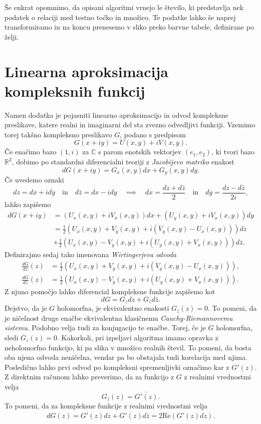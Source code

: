 \documentclass[12pt,a4paper]{amsart}
\theoremstyle{definition} %
\theoremstyle{plain} %
\newcommand{\R}{\mathbb R}
\newcommand{\CC}{\mathbb C}
\newcommand{\Real}{\mathrm{Re}}
\begin{document}
Še enkrat opomnimo, da opisani algoritmi vrnejo le število, ki predstavlja nek podatek o relaciji med testno točko in množico.
Te podatke lahko še naprej transformiramo in na koncu prenesemo v sliko preko barvne tabele, definirane po želji.

\clearpage

\appendix
\section{Linearna aproksimacija kompleksnih funkcij}
Namen dodatka je pojasniti linearno aproksimacijo in odvod kompleksne preslikave,
katere realni in imaginarni del sta zvezno odvedljivi funkciji.
Vzemimo torej takšno kompleksno preslikavo  $G$, podano s predpisom
$$G(x + iy) = U(x, y) + iV(x, y).$$
Če enačimo bazo $(1, i)$ za $\CC$ s parom enotskih vektorjev $(e_1, e_2)$, ki tvori bazo $\R^2$, 
dobimo po standardni diferencialni teoriji z {\em Jacobijevo matriko} enakost
$$dG(x + iy) = G_x(x, y) dx+  G_y(x, y) dy.$$
Če uvedemo oznaki 
$$dz = dx + i dy \quad \text{in} \quad d\bar{z} = dx - i dy \quad \implies \quad
dx = \frac{dz + d\bar{z}}{2} \quad \text{in} \quad dy = \frac{dz - d\bar{z}}{2i},$$
lahko zapišemo 
\begin{align*}
dG(x + iy) &= (U_x(x, y) + iV_x(x, y))dx + (U_y(x, y) + iV_x(x, y))dy \\
&= \frac{1}{2}(U_x(x, y) + V_y(x, y) + i(V_y(x, y) - U_x(x, y)))dz \\
&+ \frac{1}{2} (U_x(x, y) - V_y(x, y) + i(U_y(x, y) + V_x(x, y))) d\bar{z}.
\end{align*}
Definirajmo sedaj tako imenovana {\em Wirtingerjeva odvoda}
\begin{align*}
\frac{dG}{dz}(z) &= \frac{1}{2}\left(U_x(x, y) + V_y(x, y) + i(V_y(x, y) - U_x(x, y))\right), \\
\frac{dG}{d\bar{z}}(z) &= \frac{1}{2} (U_x(x, y) - V_y(x, y) + i(U_y(x, y) + V_x(x, y))).
\end{align*}
Z njuno pomočjo lahko diferencial kompleksne funkcije zapišemo kot
$$dG=G_z dz + G_{\bar{z}}d\bar{z}.$$
Dejstvo, da je $G$ holomorfna, je ekvivalentno enakosti $G_{\bar{z}}(z)=0$. 
To pomeni, da je ničelnost druge enačbe ekvivalentna klasičnemu {\em Cauchy-Riemannovemu sistemu}. 
Podobno velja tudi za konjugacijo te enačbe. Torej, če je $G$ holomorfna, sledi $\overline{G}_z(z)=0$. 
Kakorkoli, pri izpeljavi algoritma imamo opravka z neholomorfno funkcijo, ki pa slika v množico realnih števil. 
To pomeni, da bosta oba njena odvoda neničelna, vendar pa bo obstajala tudi korelacija med njima. 
Posledično lahko prvi odvod po kompleksni spremenljivki označimo kar z $G'(z)$.
Z direktnim računom lahko preverimo, da za funkcijo z $G$ z realnimi vrednostmi velja
$$G_{\bar{z}}(z) = \overline{G'(z)}.$$
To pomeni, da za kompleksne funkcije z realnimi vrednostmi velja
$$dG(z) = G'(z)dz + \overline{G'(z)}d\bar{z} =2\Real(G'(z)dz).$$
\end{document}
